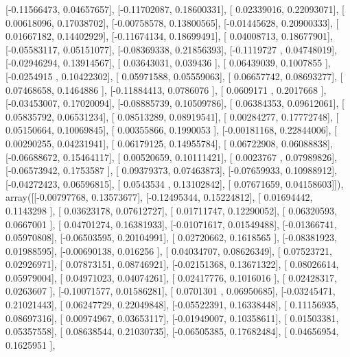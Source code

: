 \documentclass{article}
\begin{document}
       [-0.11566473,  0.04657657],
       [-0.11702087,  0.18600331],
       [ 0.02339016,  0.22093071],
       [ 0.00618096,  0.17038702],
       [-0.00758578,  0.13800565],
       [-0.01445628,  0.20900333],
       [ 0.01667182,  0.14402929],
       [-0.11674134,  0.18699491],
       [ 0.04008713,  0.18677901],
       [-0.05583117,  0.05151077],
       [-0.08369338,  0.21856393],
       [-0.1119727 ,  0.04748019],
       [-0.02946294,  0.13914567],
       [ 0.03643031,  0.039436  ],
       [ 0.06439039,  0.1007855 ],
       [-0.0254915 ,  0.10422302],
       [ 0.05971588,  0.05559063],
       [ 0.06657742,  0.08693277],
       [ 0.07468658,  0.1464886 ],
       [-0.11884413,  0.0786076 ],
       [ 0.0609171 ,  0.2017668 ],
       [-0.03453007,  0.17020094],
       [-0.08885739,  0.10509786],
       [ 0.06384353,  0.09612061],
       [ 0.05835792,  0.06531234],
       [ 0.08513289,  0.08919541],
       [ 0.00284277,  0.17772748],
       [ 0.05150664,  0.10069845],
       [ 0.00355866,  0.1990053 ],
       [-0.00181168,  0.22844006],
       [ 0.00290255,  0.04231941],
       [ 0.06179125,  0.14955784],
       [ 0.06722908,  0.06088838],
       [-0.06688672,  0.15464117],
       [ 0.00520659,  0.10111421],
       [ 0.0023767 ,  0.07989826],
       [-0.06573942,  0.1753587 ],
       [ 0.09379373,  0.07463873],
       [-0.07659933,  0.10988912],
       [-0.04272423,  0.06596815],
       [ 0.0543534 ,  0.13102842],
       [ 0.07671659,  0.04158603]]), array([[-0.00797768,  0.13573677],
       [-0.12495344,  0.15224812],
       [ 0.01694442,  0.1143298 ],
       [ 0.03623178,  0.07612727],
       [ 0.01711747,  0.12290052],
       [ 0.06320593,  0.0667001 ],
       [ 0.04701274,  0.16381933],
       [-0.01071617,  0.01549488],
       [-0.01366741,  0.05970808],
       [-0.06503595,  0.20104991],
       [ 0.02720662,  0.1618565 ],
       [-0.08381923,  0.01988595],
       [-0.00690138,  0.016256  ],
       [ 0.04034707,  0.08626349],
       [ 0.07523721,  0.02926971],
       [ 0.07873151,  0.08746921],
       [-0.02151368,  0.13671322],
       [ 0.08026614,  0.05979004],
       [ 0.04971023,  0.04074261],
       [ 0.02417776,  0.1016016 ],
       [ 0.02428317,  0.0263607 ],
       [-0.10071577,  0.01586281],
       [ 0.0701301 ,  0.06950685],
       [-0.03245471,  0.21021443],
       [ 0.06247729,  0.22049848],
       [-0.05522391,  0.16338448],
       [ 0.11156935,  0.08697316],
       [ 0.00974967,  0.03653117],
       [-0.01949007,  0.10358611],
       [ 0.01503381,  0.05357558],
       [ 0.08638544,  0.21030735],
       [-0.06505385,  0.17682484],
       [ 0.04656954,  0.1625951 ],
\end{document}
